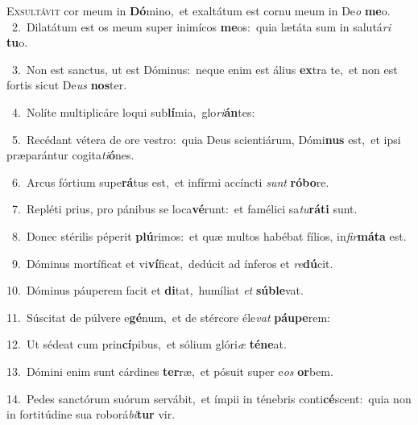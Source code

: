 \lettrine{\initial\textcolor{\initialcolor}{E}}{xsultávit} cor meum in \textbf{Dó}\-mino,~\star et exaltátum est cornu meum in De\textit{o} \textbf{me}\-o.\\
{\numbfont\textcolor{\numbcolor}{~2.}}~Dilatátum est os meum super inimícos \textbf{me}\-os:~\star quia lætáta sum in salutá\textit{ri} \textbf{tu}\-o.\par
{\numbfont\textcolor{\numbcolor}{~3.}}~Non est sanctus, ut est Dóminus:~\dagger neque enim est álius \textbf{ex}\-tra te,~\star et non est fortis sicut De\textit{us} \textbf{nos}\-ter.\par
{\numbfont\textcolor{\numbcolor}{~4.}}~Nolíte multiplicáre loqui sub\-\textbf{lí}\-mia,~\star glo\-\textit{ri}\-\textbf{án}tes:\par
{\numbfont\textcolor{\numbcolor}{~5.}}~Recédant vétera de ore vestro:~\dagger quia Deus scientiárum, Dómi\textbf{nus} est,~\star et ipsi præparántur cogita\-\textit{ti}\-\textbf{ó}nes.\par
{\numbfont\textcolor{\numbcolor}{~6.}}~Arcus fórtium supe\-\textbf{rá}\-tus est,~\star et infírmi accíncti \textit{sunt} \textbf{ró}\-\textbf{bo}re.\par
{\numbfont\textcolor{\numbcolor}{~7.}}~Repléti prius, pro pánibus se loca\-\textbf{vé}\-runt:~\star et famélici sa\-\textit{tu}\-\textbf{rá}\textbf{ti} sunt.\par
{\numbfont\textcolor{\numbcolor}{~8.}}~Donec stérilis péperit \textbf{plú}\-rimos:~\star et quæ multos habébat fílios, in\-\textit{fir}\-\textbf{má}\textbf{ta} est.\par
{\numbfont\textcolor{\numbcolor}{~9.}}~Dóminus mortíficat et vi\-\textbf{ví}\-ficat,~\star dedúcit ad ínferos et \textit{re}\-\textbf{dú}cit.\par
{\numbfont\textcolor{\numbcolor}{10.}}~Dóminus páuperem facit et \textbf{di}\-tat,~\star humíliat \textit{et} \textbf{súb}\-\textbf{le}vat.\par
{\numbfont\textcolor{\numbcolor}{11.}}~Súscitat de púlvere e\-\textbf{gé}\-num,~\star et de stércore éle\textit{vat} \textbf{páu}\-\textbf{pe}rem:\par
{\numbfont\textcolor{\numbcolor}{12.}}~Ut sédeat cum prin\-\textbf{cí}\-pibus,~\star et sólium glóri\textit{æ} \textbf{té}\-\textbf{ne}at.\par
{\numbfont\textcolor{\numbcolor}{13.}}~Dómini enim sunt cárdines \textbf{ter}\-ræ,~\star et pósuit super e\textit{os} \textbf{or}\-bem.\par
{\numbfont\textcolor{\numbcolor}{14.}}~Pedes sanctórum suórum servábit,~\dagger et ímpii in ténebris conti\-\textbf{cé}\-scent:~\star quia non in fortitúdine sua roborá\-\textit{bi}\-\textbf{tur} vir.\par
